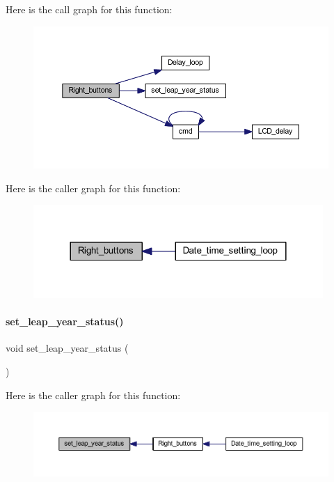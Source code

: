Here is the call graph for this function\+:
\nopagebreak
\begin{figure}[H]
\begin{center}
\leavevmode
\includegraphics[width=350pt]{a00026_a5c01f8b6feb96baa4580a82f5c32c16e_cgraph}
\end{center}
\end{figure}
Here is the caller graph for this function\+:
\nopagebreak
\begin{figure}[H]
\begin{center}
\leavevmode
\includegraphics[width=312pt]{a00026_a5c01f8b6feb96baa4580a82f5c32c16e_icgraph}
\end{center}
\end{figure}
\mbox{\label{a00026_a80accba9dc1e620801d10506e76cc182}} 
\paragraph{set\+\_\+leap\+\_\+year\+\_\+status()}
{\footnotesize\ttfamily void set\+\_\+leap\+\_\+year\+\_\+status (\begin{DoxyParamCaption}{ }\end{DoxyParamCaption})\hspace{0.3cm}{\ttfamily [inline]}}

Here is the caller graph for this function\+:
\nopagebreak
\begin{figure}[H]
\begin{center}
\leavevmode
\includegraphics[width=350pt]{a00026_a80accba9dc1e620801d10506e76cc182_icgraph}
\end{center}
\end{figure}


